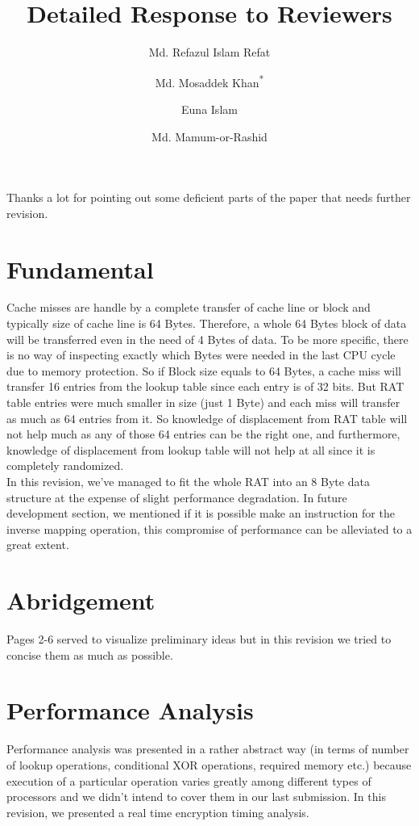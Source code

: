 \documentclass[3p]{elsarticle}
\begin{document}
\begin{frontmatter}

\title{Detailed Response to Reviewers}
\author[]{Md. Refazul Islam Refat}
\author[]{Md. Mosaddek Khan\textsuperscript{*}}
\author[]{Euna Islam}
\author[]{Md. Mamum-or-Rashid}

\end{frontmatter}

Thanks a lot for pointing out some deficient parts of the paper that needs further revision. 

\section{Fundamental}
Cache misses are handle by a complete transfer of cache line or block and typically size of cache line is 64 Bytes. Therefore, a whole 64 Bytes block of data will be transferred even in the need of 4 Bytes of data. To be more specific, there is no way of inspecting exactly which Bytes were needed in the last CPU cycle due to memory protection. So if Block size equals to 64 Bytes, a cache miss will transfer 16 entries from the lookup table since each entry is of 32 bits. But RAT table entries were much smaller in size (just 1 Byte) and each miss will transfer as much as 64 entries from it. So knowledge of displacement from RAT table will not help much as any of those 64 entries can be the right one, and furthermore, knowledge of displacement from lookup table
will not help at all since it is completely randomized.\\

In this revision, we've managed to fit the whole RAT into an 8 Byte data structure at the expense of slight performance degradation. In future development section, we mentioned if it is possible make an instruction for the inverse mapping operation, this compromise of performance can be alleviated to a great extent.

\section{Abridgement}
Pages 2-6 served to visualize preliminary ideas but in this revision we tried to concise them as much as possible.

\section{Performance Analysis}
Performance analysis was presented in a rather abstract way (in terms of number of lookup operations, conditional XOR operations, required memory etc.) because execution of a particular operation varies greatly among different types of processors and we didn't intend to cover them in our last submission. In this revision, we presented a real time encryption timing analysis.
\end{document}
